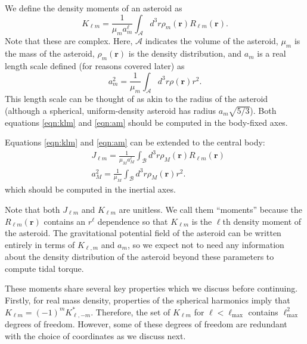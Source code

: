 \documentclass[fleqn,usenatbib]{mnras}
\begin{document}
We define the density moments of an asteroid as
\begin{equation}
  K_{\ell m} = \frac{1}{\mu_m a_m^\ell} \int_\mathcal{A} d^3 r \rho_m(\bm r) R_{\ell m}(\bm r).
  \label{eqn:klm}
\end{equation}
Note that these are complex. Here, $\mathcal{A}$ indicates the volume of the asteroid, $\mu_m$ is the mass of the asteroid, $\rho_m(\bm r)$ is the density distribution, and $a_m$ is a real length scale defined (for reasons covered later) as 
\begin{equation}
  a_m^2 = \frac{1}{\mu_m} \int_\mathcal{A} d^3 r \rho(\bm r) r^2.
  \label{eqn:am}
\end{equation}
This length scale can be thought of as akin to the radius of the asteroid (although a spherical, uniform-density asteroid has radius $a_m\sqrt{5/3} $). Both equations \ref{eqn:klm} and \ref{eqn:am} should be computed in the body-fixed axes.

Equations \ref{eqn:klm} and \ref{eqn:am} can be extended to the central body:
\begin{equation}
  \begin{split}
    &J_{\ell m} = \frac{1}{\mu_M a_M^\ell} \int_\mathcal{B} d^3 r \rho_M(\bm r) R_{\ell m}(\bm r)\\
    &a_M^2 = \frac{1}{\mu_M} \int_\mathcal{B} d^3 r \rho_M(\bm r) r^2.
  \label{eqn:jlm}
  \end{split}
\end{equation}
which should be computed in the inertial axes.

Note that both $J_{\ell m}$ and $K_{\ell m}$ are unitless. We call them ``moments'' because the $R_{\ell m}(\bm r)$ contains an $r^\ell$ dependence so that $K_{\ell m}$ is the $\ell$th density moment of the asteroid. The gravitational potential field of the asteroid can be written entirely in terms of $K_{\ell, m}$ and $a_m$, so we expect not to need any information about the density distribution of the asteroid beyond these parameters to compute tidal torque.

These moments share several key properties which we discuss before continuing. Firstly, for real mass density, properties of the spherical harmonics imply that $K_{\ell m} = (-1)^m K_{\ell, -m}^*$. Therefore, the set of $K_{\ell m}$ for $\ell < \ell_\text{max}$ contains $\ell_\text{max}^2$ degrees of freedom. However, some of these degrees of freedom are redundant with the choice of coordinates as we discuss next.
\end{document}
